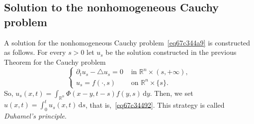 \documentclass[a4paper,9pt]{amsart}
\newcommand{\R}{\mathbb{R}}	%
\newcommand{\did}{\,\mathrm{d}}	%
\newcommand{\de}{\partial}		%
\newcommand{\laplacian}{\triangle}
\theoremstyle{plain}
\theoremstyle{definition}
\theoremstyle{remark}
\begin{document}
\subsection{Solution to the nonhomogeneous Cauchy problem}\label{subs67c34370}

A solution for the nonhomogeneous Cauchy problem~\eqref{eq67c344a9} is constructed as follows.
For every $s>0$ let $u_s$ be the solution constructed in the previous Theorem for the Cauchy problem
\begin{equation}
\begin{cases}
	\de_t u_s - \laplacian u_s = 0 & \text{ in }\R^n\times (s,+\infty) , \\
	u_s = f(\cdot,s) & \text{ on }\R^n\times\{s\} .
\end{cases}
\end{equation}
So, $u_s(x,t) = \int_{\R^n} \Phi(x-y,t-s) f(y,s) \did y$.
Then, we set $u(x,t) = \int_0^t u_s(x,t) \did s$, that is,~\eqref{eq67c34492}.
This strategy is called \emph{Duhamel's principle}.
\end{document}
